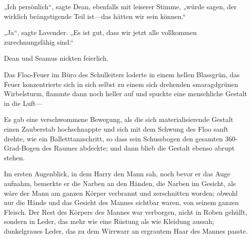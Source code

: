 „Ich persönlich“, sagte Dean, ebenfalls mit leiserer Stimme, „würde sagen, der wirklich beängstigende Teil ist—das hätten wir sein können.“

„Ja“, sagte Lavender. „Es ist gut, dass wir jetzt alle vollkommen zurechnungsfähig sind.“

Dean und Seamus nickten feierlich.


Das Floo-Feuer im Büro des Schulleiters loderte in einem hellen Blassgrün, das Feuer konzentrierte sich in sich selbst zu einem sich drehenden smaragdgrünen Wirbelsturm, flammte dann noch heller auf und spuckte eine menschliche Gestalt in die Luft—

Es gab eine verschwommene Bewegung, als die sich materialisierende Gestalt einen Zauberstab hochschnappte und sich mit dem Schwung des Floo sanft drehte, wie ein Balletttanzschritt, so dass sein Schussbogen den gesamten 360-Grad-Bogen des Raumes abdeckte; und dann blieb die Gestalt ebenso abrupt stehen.

Im ersten Augenblick, in dem Harry den Mann sah, noch bevor er das Auge aufnahm, bemerkte er die Narben an den Händen, die Narben im Gesicht, als wäre der Mann am ganzen Körper verbrannt und zerschnitten worden; obwohl nur die Hände und das Gesicht des Mannes sichtbar waren, von seinem ganzen Fleisch. Der Rest des Körpers des Mannes war verborgen, nicht in Roben gehüllt, sondern in Leder, das mehr wie eine Rüstung als wie Kleidung aussah; dunkelgraues Leder, das zu dem Wirrwarr an ergrautem Haar des Mannes passte.


